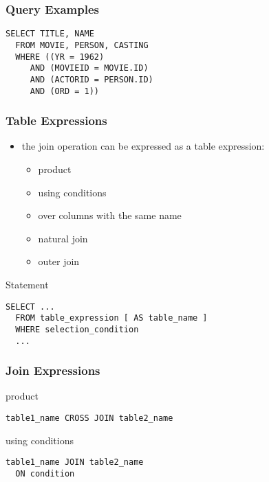 \documentclass[dvipsnames]{beamer}
\theoremstyle{plain}
\begin{document}
\begin{frame}[fragile]
  \frametitle{Query Examples}

  \begin{example}
    \begin{lstlisting}
SELECT TITLE, NAME
  FROM MOVIE, PERSON, CASTING
  WHERE ((YR = 1962)
     AND (MOVIEID = MOVIE.ID)
     AND (ACTORID = PERSON.ID)
     AND (ORD = 1))
    \end{lstlisting}
  \end{example}
\end{frame}

\begin{frame}[fragile]
  \frametitle{Table Expressions}

  \begin{itemize}
    \item the join operation can be expressed as a table expression:
    \begin{itemize}
      \item product
      \item using conditions
      \item over columns with the same name
      \item natural join
      \item outer join
    \end{itemize}
  \end{itemize}

  \begin{block}{Statement}
    \begin{lstlisting}
SELECT ...
  FROM table_expression [ AS table_name ]
  WHERE selection_condition
  ...
    \end{lstlisting}
  \end{block}
\end{frame}

\begin{frame}[fragile]
  \frametitle{Join Expressions}

  \begin{block}{product}
    \begin{lstlisting}
table1_name CROSS JOIN table2_name
    \end{lstlisting}
  \end{block}

  \pause
  \begin{block}{using conditions}
    \begin{lstlisting}
table1_name JOIN table2_name
  ON condition
    \end{lstlisting}
  \end{block}
\end{frame}
\end{document}
